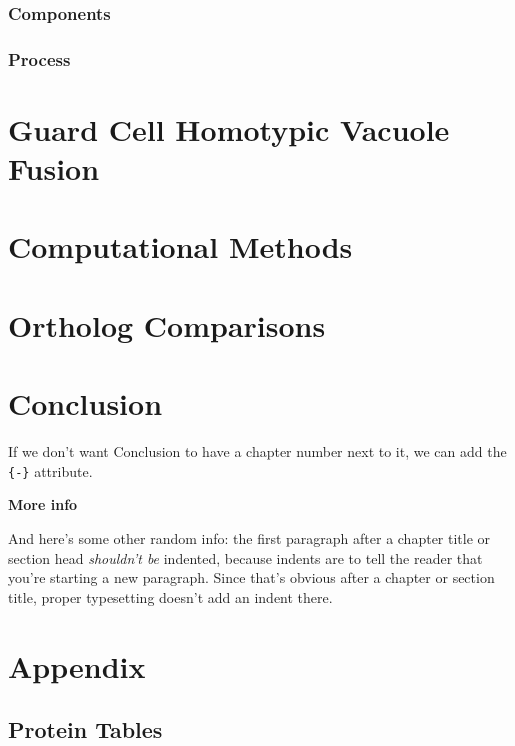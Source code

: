 \documentclass[12pt,twoside]{reedthesis}
\begin{document}
\subsection{Components}\label{components-3}

\subsection{Process}\label{process-3}

\chapter{Guard Cell Homotypic Vacuole Fusion}\label{GuardFusion}

\chapter{Computational Methods}\label{CompMethods}

\chapter{Ortholog Comparisons}\label{OrthoComp}

\chapter*{Conclusion}\label{conclusion}

If we don't want Conclusion to have a chapter number next to it, we can add the \texttt{\{-\}} attribute.

\textbf{More info}

And here's some other random info: the first paragraph after a chapter title or section head \emph{shouldn't be} indented, because indents are to tell the reader that you're starting a new paragraph. Since that's obvious after a chapter or section title, proper typesetting doesn't add an indent there.

\chapter*{Appendix}\label{appendix}

\section*{Protein Tables}\label{protein-tables}
\end{document}
